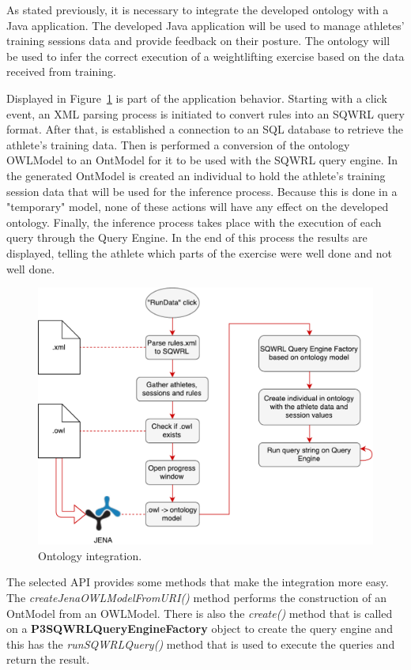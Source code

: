 As stated previously, it is necessary to integrate the developed ontology with a Java application.
The developed Java application will be used to manage athletes' training sessions data and provide feedback on their posture.
The ontology will be used to infer the correct execution of a weightlifting exercise based on the data received from training.

Displayed in Figure~\ref{fig:ont_int} is part of the application behavior.
Starting with a click event, an XML parsing process is initiated to convert rules into an SQWRL query format.
After that, is established a connection to an SQL database to retrieve the athlete's training data.
Then is performed a conversion of the ontology OWLModel to an OntModel for it to be used with the SQWRL query engine.
In the generated OntModel is created an individual to hold the athlete's training session data that will be used for the inference process.
Because this is done in a "temporary" model, none of these actions will have any effect on the developed ontology.
Finally, the inference process takes place with the execution of each query through the Query Engine.
In the end of this process the results are displayed, telling the athlete which parts of the exercise were well done and not well done.

\begin{figure}[h]
	\centering
		\includegraphics[width=1.00\textwidth]{Images/integration.pdf}
	\caption{Ontology integration.}
	\label{fig:ont_int}
\end{figure}

The selected API provides some methods that make the integration more easy.
The \textit{createJenaOWLModelFromURI()} method performs the construction of an OntModel from an OWLModel.
There is also the \textit{create()} method that is called on a \textbf{P3SQWRLQueryEngineFactory} object to create the query engine and this has the \textit{runSQWRLQuery()} method that is used to execute the queries and return the result. 

